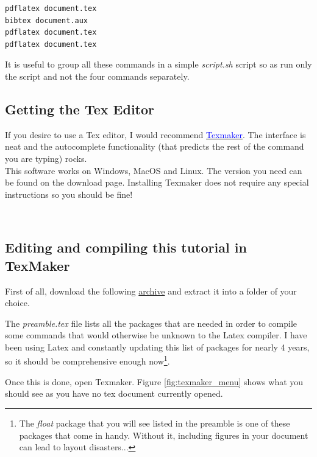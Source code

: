 \begin{lstlisting}[language = {}]
pdflatex document.tex
bibtex document.aux
pdflatex document.tex
pdflatex document.tex
\end{lstlisting}

It is useful to group all these commands in a simple \textit{script.sh} script so as run only the script and not the four commands separately. 

\subsection{Getting the Tex Editor}
If you desire to use a Tex editor, I would recommend
\href{http://www.xm1math.net/texmaker/}{\textcolor{blue}{Texmaker}}. The interface is neat and the autocomplete functionality (that predicts the rest of the command you are typing) rocks.\\
This software works on Windows, MacOS and Linux. The version you need can be found on the download page. Installing Texmaker does not require any special instructions so you should be fine!

\


\subsection{Editing and compiling this tutorial in TexMaker}

First of all, download the following \href{https://drive.google.com/file/d/0Bzf79yzZcPJJNVhKNFBxWGs1aEE/view?usp=sharing}{archive} and extract it into a folder of your choice.

The \textit{preamble.tex} file lists all the packages that are needed in order to compile some commands that would otherwise be unknown to the Latex compiler. I have been using Latex and constantly updating this list of packages for nearly 4 years, so it should be comprehensive enough now\footnote{The \textit{float} package that you will see listed in the preamble is one of these packages that come in handy. Without it, including figures in your document can lead to layout disasters... }.

Once this is done, open Texmaker. Figure \ref{fig:texmaker_menu} shows what you should see as you have no tex document currently opened.

